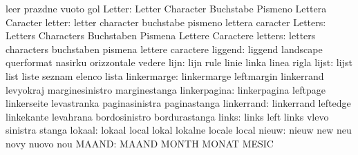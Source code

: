                            leer                      prazdne
                           vuoto                     gol
                   Letter: Letter                    Character
                           Buchstabe                 Pismeno
                           Lettera                   Caracter
                   letter: letter                    character
                           buchstabe                 pismeno
                           lettera                   caracter
                  Letters: Letters                   Characters
                           Buchstaben                Pismena
                           Lettere                   Caractere
                  letters: letters                   characters
                           buchstaben                pismena
                           lettere                   caractere
                  liggend: liggend                   landscape
                           querformat                nasirku
                           orizzontale               vedere
                     lijn: lijn                      rule
                           linie                     linka
                           linea                     rigla
                    lijst: lijst                     list
                           liste                     seznam
                           elenco                    lista
              linkermarge: linkermarge               leftmargin
                           linkerrand                levyokraj
                           marginesinistro           marginestanga
             linkerpagina: linkerpagina              leftpage
                           linkerseite               levastranka
                           paginasinistra            paginastanga
               linkerrand: linkerrand                leftedge
                           linkekante                levahrana
                           bordosinistro             bordurastanga
                    links: links                     left
                           links                     vlevo
                           sinistra                  stanga
                   lokaal: lokaal                    local
                           lokal                     lokalne
                           locale                    local
                    nieuw: nieuw                     new
                           neu                       novy
                           nuovo                     nou
                    MAAND: MAAND                     MONTH
                           MONAT                     MESIC
